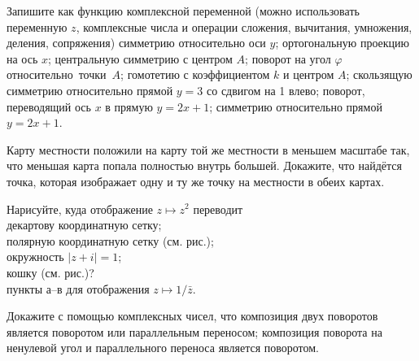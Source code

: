\documentclass[a4paper,12pt]{article}
\begin{document}
Запишите %
как функцию комплексной переменной (можно использовать переменную $z$, комплексные числа и операции сложения, вычитания, умножения, деления, сопряжения)
{ симме\-трию относительно оси $y$;}
{ ортогона\-ль\-ную проекцию на ось $x$;}
{ центральную симметрию с центром $A$;}
{ поворот на угол $\varphi$ относительно~точки~$A$;}
{ гомотетию с коэффициентом $k$ и центром $A$;}
{}
 скользящую симметрию относительно прямой $y=3$ со сдвигом на 1 влево;
 поворот, переводящий ось $x$ в прямую $y=2x+1$;
 симметрию относительно прямой $y=2x+1$.




  Карту местности положили на карту той же местности в меньшем масштабе так, что меньшая карта попала полностью внутрь большей.
  Докажите, что найдётся точка, которая изображает одну и ту же точку на местности в обеих картах.


Нарисуйте, куда отображение $z\longmapsto z^2$ переводит\\
декартову координатную сетку;\\
полярную координатную сетку (см. рис.);\\
окружность $|z+i|=1$;\\
кошку (см. рис.)?\\
пункты а--в для отображения $z\longmapsto 1/\bar z$.





Докажите с помощью комплексных чисел, что
композиция двух поворотов является поворотом или параллельным переносом;
композиция поворота на ненулевой угол и параллельного переноса является поворотом.
\end{document}
